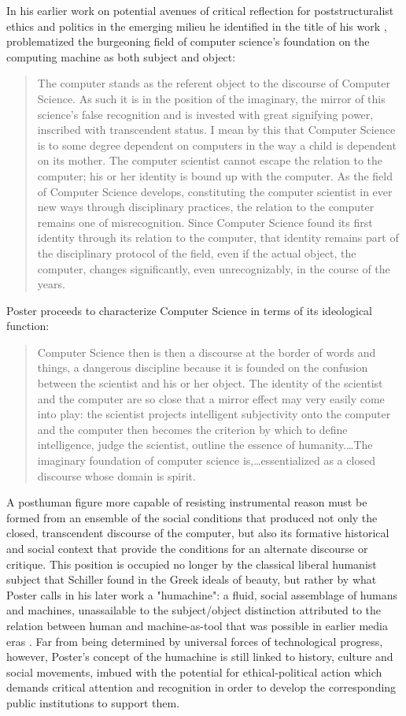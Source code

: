 In his earlier work on potential avenues of critical reflection for poststructuralist ethics and politics in the emerging milieu he identified in the title of his work , \citeauthor{Poster1990} problematized the burgeoning field of computer science's foundation on the computing machine as both subject and object: \blockcquote[147]{Poster1990}{
  The computer stands as the referent object to the discourse of Computer Science. As such it is in the position of the imaginary, the mirror of this science's false recognition and is invested with great signifying power, inscribed with transcendent status. I mean by this that Computer Science is to some degree dependent on computers in the way a child is dependent on its mother. The computer scientist cannot escape the relation to the computer; his or her identity is bound up with the computer. As the field of Computer Science develops, constituting the computer scientist in ever new ways through disciplinary practices, the relation to the computer remains one of misrecognition. Since Computer Science found its first identity through its relation to the computer, that identity remains part of the disciplinary protocol of the field, even if the actual object, the computer, changes significantly, even unrecognizably, in the course of the years.
}
Poster proceeds to characterize Computer Science in terms of its ideological function: \blockcquote[148]{Poster1990}{
  Computer Science then is then a discourse at the border of words and things, a dangerous discipline because it is founded on the confusion between the scientist and his or her object. The identity of the scientist and the computer are so close that a mirror effect may very easily come into play: the scientist projects intelligent subjectivity onto the computer and the computer then becomes the criterion by which to define intelligence, judge the scientist, outline the essence of humanity.…The imaginary foundation of computer science is,…essentialized as a closed discourse whose domain is spirit.
}
A posthuman figure more capable of resisting instrumental reason must be formed from an ensemble of the social conditions that produced not only the closed, transcendent discourse of the computer, but also its formative historical and social context that provide the conditions for an alternate discourse or critique. This position is occupied no longer by the classical liberal humanist subject that Schiller found in the Greek ideals of beauty, but rather by what Poster calls in his later work a "humachine": a fluid, social assemblage of humans and machines, unassailable to the subject/object distinction attributed to the relation between human and machine-as-tool that was possible in earlier media eras \autocite{Poster2006}. Far from being determined by universal forces of technological progress, however, Poster's concept of the humachine is still linked to history, culture and social movements, imbued with the potential for ethical-political action which demands critical attention and recognition in order to develop the corresponding public institutions to support them.

